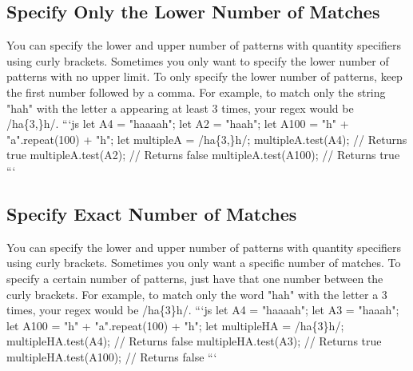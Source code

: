 \documentclass{article}%
\begin{document}
%
\subsection{Specify Only the Lower Number of Matches}%
\label{subsec:SpecifyOnlytheLowerNumberofMatches}%
You can specify the lower and upper number of patterns with quantity specifiers using curly brackets. Sometimes you only want to specify the lower number of patterns with no upper limit.\newline%
To only specify the lower number of patterns, keep the first number followed by a comma.\newline%
For example, to match only the string "hah" with the letter a appearing at least 3 times, your regex would be /ha\{3,\}h/.\newline%
```js\newline%
let A4 = "haaaah";\newline%
let A2 = "haah";\newline%
let A100 = "h" + "a".repeat(100) + "h";\newline%
let multipleA = /ha\{3,\}h/;\newline%
multipleA.test(A4); // Returns true\newline%
multipleA.test(A2); // Returns false\newline%
multipleA.test(A100); // Returns true\newline%
```\newline%

%
\subsection{Specify Exact Number of Matches}%
\label{subsec:SpecifyExactNumberofMatches}%
You can specify the lower and upper number of patterns with quantity specifiers using curly brackets. Sometimes you only want a specific number of matches.\newline%
To specify a certain number of patterns, just have that one number between the curly brackets.\newline%
For example, to match only the word "hah" with the letter a 3 times, your regex would be /ha\{3\}h/.\newline%
```js\newline%
let A4 = "haaaah";\newline%
let A3 = "haaah";\newline%
let A100 = "h" + "a".repeat(100) + "h";\newline%
let multipleHA = /ha\{3\}h/;\newline%
multipleHA.test(A4); // Returns false\newline%
multipleHA.test(A3); // Returns true\newline%
multipleHA.test(A100); // Returns false\newline%
```\newline%
\end{document}
